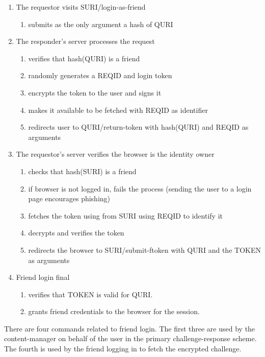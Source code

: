 \documentclass[letterpaper,11pt,oneside]{article}
\begin{document}
\begin{enumerate}
\item The requestor visits SURI/login-as-friend
    \begin{enumerate}
    \item submits as the only argument a hash of QURI
    \end{enumerate}

\item The responder's server processes the request
    \begin{enumerate}
    \item verifies that hash(QURI) is a friend
    \item randomly generates a REQID and login token
    \item encrypts the token to the user and signs it
    \item makes it available to be fetched with REQID as identifier
    \item redirects user to QURI/return-token with hash(QURI) and REQID as
            arguments
    \end{enumerate}

\item The requestor's server verifies the browser is the identity owner
    \begin{enumerate}
    \item checks that hash(SURI) is a friend
    \item if browser is not logged in, fails the process
            (sending the user to a login page encourages phishing)
    \item fetches the token using from SURI using REQID to identify it
    \item decrypts and verifies the token
    \item redirects the browser to SURI/submit-ftoken with QURI and the TOKEN
            as arguments
    \end{enumerate}

\item Friend login final
    \begin{enumerate}
    \item verifies that TOKEN is valid for QURI.
    \item grants friend credentials to the browser for the session.
    \end{enumerate}
\end{enumerate}

There are four commands related to friend login. The first three are used by
the content-manager on behalf of the user in the primary challenge-response scheme.
The fourth is used by the friend logging in to fetch the encrypted challenge.
\end{document}
